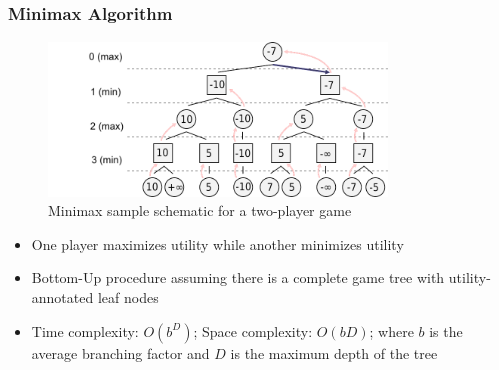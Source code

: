 \documentclass{beamer}
\begin{document}
\subsection{}
\begin{framefont}{\footnotesize}
  \begin{frame}
    \frametitle{Minimax Algorithm}
    \begin{figure}
      \centering
      \includegraphics[trim={0cm -0.5cm 0cm 0cm},clip,width=9cm]{Minimax.png}
      \caption{Minimax sample schematic for a two-player game }
    \end{figure}
    \vspace{-10pt}
    \begin{itemize}[<+->]
    \item One player maximizes utility while another minimizes utility
    \item Bottom-Up procedure assuming there is a complete game tree with utility-annotated leaf nodes
    \item Time complexity: $O(b^D)$; Space complexity: $O(bD)$; where $b$ is the average branching factor and $D$ is the maximum depth of the tree 
    \end{itemize}
  \end{frame}
\end{framefont}
\end{document}
